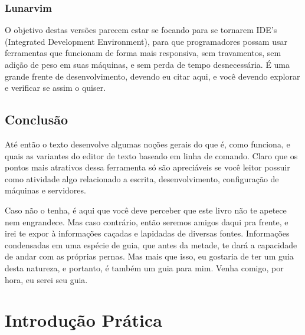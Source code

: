 \documentclass[a4paper, 12pt]{article}
\begin{document}
\subsubsection{Lunarvim}
O objetivo destas versões parecem estar se focando para se tornarem IDE's (Integrated Development Environment), para que programadores possam usar ferramentas que funcionam de forma mais responsiva, sem travamentos, sem adição de peso em suas máquinas, e sem perda de tempo desnecessária.
É uma grande frente de desenvolvimento, devendo eu citar aqui, e você devendo explorar e verificar se assim o quiser.

\subsection{Conclusão}
Até então o texto desenvolve algumas noções gerais do que é, como funciona, e quais as variantes do editor de texto baseado em linha de comando.
Claro que os pontos mais atrativos dessa ferramenta só são apreciáveis se você leitor possuir como atividade algo relacionado a escrita, desenvolvimento, configuração de máquinas e servidores.

Caso não o tenha, é aqui que você deve perceber que este livro não te apetece nem engrandece.
Mas caso contrário, então seremos amigos daqui pra frente, e irei te expor à informações caçadas e lapidadas de diversas fontes.
Informações condensadas em uma espécie de guia, que antes da metade, te dará a capacidade de andar com as próprias pernas.
Mas mais que isso, eu gostaria de ter um guia desta natureza, e portanto, é também um guia para mim.
Venha comigo, por hora, eu serei seu guia.


\section{Introdução Prática}
\end{document}
